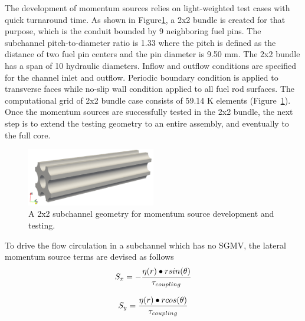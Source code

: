The development of momentum sources relies on light-weighted test cases with quick turnaround time. As shown in Figure\ref{fig:model2x2}, a 2x2 bundle is created for that purpose, which is the conduit bounded by 9 neighboring fuel pins. The subchannel pitch-to-diameter ratio is 1.33 where the pitch is defined as the distance of two fuel pin centers and the pin diameter is 9.50 mm. The 2x2 bundle has a span of 10 hydraulic diameters. Inflow and outflow conditions are specified for the channel inlet and outflow. Periodic boundary condition is applied to transverse faces while no-slip wall condition applied to all fuel rod surfaces. The computational grid of 2x2 bundle case consists of 59.14 K elements (Figure~\ref{fig:model2x2}). Once the momentum sources are successfully tested in the 2x2 bundle, the next step is to extend the testing geometry to an entire assembly, and eventually to the full core. 

\begin{figure}[!ht]
\centering
\includegraphics[width=0.5\textwidth]{./figures/3DModel_of_bundle2x2.png}
\caption{A 2x2 subchannel geometry for momentum source development and testing. }
\label{fig:model2x2}
\end{figure}

To drive the flow circulation in a subchannel which has no SGMV, the lateral momentum source terms are devised as follows 
\begin{equation}
  S_x = -\frac{\eta(r)\bullet r sin(\theta)}{\tau_{coupling}}\\
\end{equation}

\begin{equation}
  S_y = \frac{\eta(r)\bullet r cos(\theta)}{\tau_{coupling}}\\
\end{equation}

